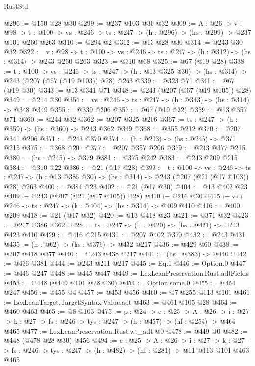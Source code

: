 \begin{lexlean}{RustStd}
\begin{coremodule}
{\begin{coremodule}
{@296 := @150 @28 @30
@299 := @237 @103 @30 @32
@309 := {A : @26} ->
  {v : @98} ->
  {t : @100} -> {vs : @246} -> {ts : @247} -> (h : @296) -> (hs : @299) -> @237 @101 @260 @263
@310 := @294 @2
@312 := @13 @28 @30
@314 := @243 @30 @32
@322 := {v : @98} ->
  {t : @100} -> {vs : @246} -> {ts : @247} -> (h : @312) -> (hs : @314) -> @243 @260 @263
@323 := @310 @68
@325 := @67 (@19 @28)
@338 := {t : @100} ->
  {vs : @246} ->
  {ts : @247} -> (h : @13 @325 @30) -> (hs : @314) -> @243 (@207 (@67 (@19 @103)) @28) @263
@339 := @323 @71
@341 := @67 (@19 @30)
@343 := @13 @341 @71
@348 := @243 (@207 (@67 (@19 @105)) @28)
@349 := @214 @30
@354 := {vs : @246} -> {ts : @247} -> (h : @343) -> (hs : @314) -> @348 @349
@355 := @339 @206
@357 := @67 (@19 @32)
@359 := @13 @357 @71
@360 := @244 @32
@362 := @207 @325 @206
@367 := {ts : @247} -> (h : @359) -> (hs : @360) -> @243 @362 @349
@368 := @355 @212
@370 := @207 @341 @206
@371 := @243 @370
@374 := (h : @203) -> (hs : @245) -> @371 @215
@375 := @368 @201
@377 := @207 @357 @206
@379 := @243 @377 @215
@380 := (hs : @245) -> @379
@381 := @375 @242
@383 := @243 @209 @215
@384 := @310 @22
@386 := @21 (@17 @28)
@399 := {t : @100} ->
  {vs : @246} ->
  {ts : @247} -> (h : @13 @386 @30) -> (hs : @314) -> @243 (@207 (@21 (@17 @103)) @28) @263
@400 := @384 @23
@402 := @21 (@17 @30)
@404 := @13 @402 @23
@409 := @243 (@207 (@21 (@17 @105)) @28)
@410 := @216 @30
@415 := {vs : @246} -> {ts : @247} -> (h : @404) -> (hs : @314) -> @409 @410
@416 := @400 @209
@418 := @21 (@17 @32)
@420 := @13 @418 @23
@421 := @371 @32
@423 := @207 @386 @362
@428 := {ts : @247} -> (h : @420) -> (hs : @421) -> @243 @423 @410
@429 := @416 @215
@431 := @207 @402 @370
@432 := @243 @431
@435 := (h : @62) -> (hs : @379) -> @432 @217
@436 := @429 @60
@438 := @207 @418 @377
@440 := @243 @438 @217
@441 := (hs : @383) -> @440
@442 := @436 @381
@444 := @243 @211 @217
@445 := Eq.{1}
@446 := Option.{0}
@447 := @446 @247
@448 := @445 @447
@449 := LexLeanPreservation.Rust.adtFields
@453 := @448 (@449 @101 @28 @30)
@454 := Option.some.{0}
@455 := @454 @247
@456 := @455 @4
@457 := @453 @456
@460 := @7 @255 @113 @101
@461 := LexLeanTarget.TargetSyntax.Value.adt
@463 := @461 @105 @28
@464 := @460 @463
@465 := @8 @103
@475 := {p : @24} ->
  {c : @25} ->
  {A : @26} ->
  {i : @27} -> {k : @27} -> {fs : @246} -> {tys : @247} -> (h : @457) -> (hf : @254) -> @464 @465
@477 := LexLeanPreservation.Rust.wt_adt @0
@478 := @449 @0
@482 := @448 (@478 @28 @30) @456
@494 := {c : @25} ->
  {A : @26} ->
  {i : @27} ->
  {k : @27} -> {fs : @246} -> {tys : @247} -> (h : @482) -> (hf : @281) -> @11 @113 @101 @463 @465
}
\end{coremodule}}
\end{coremodule}
\end{lexlean}

